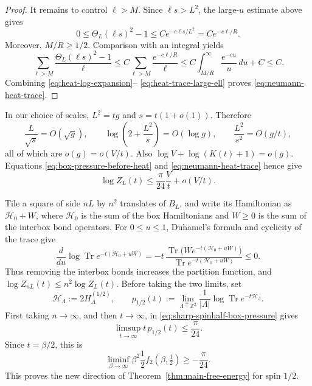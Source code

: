 \documentclass[11pt]{article}
\numberwithin{equation}{section}
\theoremstyle{remark}
\newcommand{\Z}{\mathbb Z}
\newcommand{\Tr}{\operatorname{Tr}}
\newcommand{\1}{\mathbf 1}
\begin{document}
\begin{proof}
It remains to control \(\ell>M\).  Since \(\ell s>L^2\), the large-\(u\)
estimate above gives
\[
 0\leq\Theta_L(\ell s)^2-1
 \leq Ce^{-c\ell s/L^2}=Ce^{-c\ell/R}.
\]
Moreover, \(M/R\geq1/2\).  Comparison with an integral yields
\begin{equation}
 \sum_{\ell>M}\frac{\Theta_L(\ell s)^2-1}{\ell}
 \leq C\sum_{\ell>M}\frac{e^{-c\ell/R}}{\ell}
 \leq C\int_{M/R}^{\infty}\frac{e^{-cu}}{u}\,du+C
 \leq C.
 \label{eq:heat-trace-large-ell}
\end{equation}
Combining \eqref{eq:heat-log-expansion}--
\eqref{eq:heat-trace-large-ell} proves
\eqref{eq:neumann-heat-trace}.
\end{proof}

In our choice of scales, \(L^2=tg\) and \(s=t(1+o(1))\).  Therefore
\[
 \frac{L}{\sqrt s}=O(\sqrt g),\qquad
 \log\!\left(2+\frac{L^2}{s}\right)=O(\log g),\qquad
 \frac{L^2}{s^2}=O(g/t),
\]
all of which are \(o(g)=o(V/t)\).  Also
\(\log V+\log(K(t)+1)=o(g)\).  Equations
\eqref{eq:box-pressure-before-heat} and
\eqref{eq:neumann-heat-trace} hence give
\begin{equation}
 \log Z_L(t)\leq\frac{\pi}{24}\frac{V}{t}+o(V/t).
 \label{eq:sharp-spinhalf-box-pressure}
\end{equation}

Tile a square of side \(nL\) by \(n^2\) translates of \(B_L\), and write
its Hamiltonian as \(\mathcal H_0+W\), where \(\mathcal H_0\) is the sum
of the box Hamiltonians and \(W\geq0\) is the sum of the interbox bond
operators.  For \(0\leq u\leq1\), Duhamel's formula and cyclicity of the
trace give
\begin{equation}
 \frac{d}{du}\log\Tr e^{-t(\mathcal H_0+uW)}
 =-t\,\frac{\Tr\bigl(W e^{-t(\mathcal H_0+uW)}\bigr)}
              {\Tr e^{-t(\mathcal H_0+uW)}}\leq0.
 \label{eq:bond-dropping-duhamel}
\end{equation}
Thus removing the interbox bonds increases the partition function, and
\(\log Z_{nL}(t)\leq n^2\log Z_L(t)\).  Before taking the two limits, set
\[
 \mathcal H_\Lambda:=2H_\Lambda^{(1/2)},\qquad
 p_{1/2}(t):=\lim_{\Lambda\uparrow\Z^2}
 \frac1{|\Lambda|}\log\Tr e^{-t\mathcal H_\Lambda}.
\]
First taking \(n\to\infty\), and then \(t\to\infty\), in
\eqref{eq:sharp-spinhalf-box-pressure} gives
\[
 \limsup_{t\to\infty}t\,p_{1/2}(t)\leq\frac{\pi}{24}.
\]
Since \(t=\beta/2\), this is
\begin{equation}
 \liminf_{\beta\to\infty}
 \beta^2\frac12 f_2(\beta,\tfrac12)\geq-\frac\pi{24}.
 \label{eq:spinhalf-new-direction}
\end{equation}
This proves the new direction of Theorem~\ref{thm:main-free-energy} for
spin \(1/2\).
\end{document}
